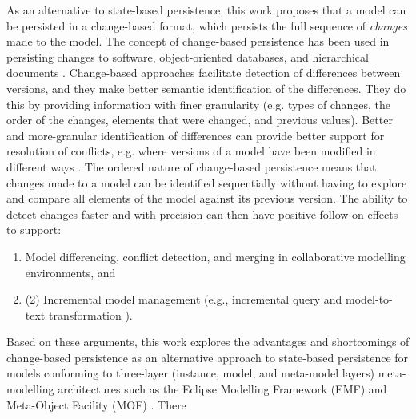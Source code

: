 As an alternative to state-based persistence, this work proposes that a model can be persisted in a change-based format, which persists the full sequence of \emph{changes} made to the model.
The concept of change-based persistence has been used in persisting changes to software, object-oriented databases, and hierarchical documents \cite{DBLP:journals/entcs/RobbesL07,DBLP:conf/sde/LippeO92,DBLP:conf/caise/IgnatN05}. Change-based approaches facilitate detection of differences between versions, and they make better semantic identification of the differences. They do this by providing information with finer granularity (e.g. types of changes, the order of the changes, elements that were changed, and previous values). Better and more-granular identification of differences can provide better support for resolution of conflicts, e.g. where versions of a model have been modified in different ways \cite{mens2002state}.
The ordered nature of change-based persistence means that changes made to a model can be identified sequentially without having to explore and compare all elements of the model against its previous version. The ability to detect changes faster and with precision can then have positive follow-on effects to support:
\begin{enumerate}
  \item Model differencing, conflict detection, and merging in collaborative modelling environments, and 
  \item (2) Incremental model management (e.g., incremental query \cite{DBLP:conf/ecmdafa/RathHV12} and model-to-text 
 transformation \cite{DBLP:conf/ecmdafa/OgunyomiRK15}).  
\end{enumerate}
Based on these arguments, this work explores the advantages and shortcomings of change-based persistence as an alternative approach to state-based persistence for models conforming to three-layer (instance, model, and meta-model layers) meta-modelling architectures such as the Eclipse Modelling Framework (EMF) \cite{eclipse2019emf} and Meta-Object Facility (MOF) \cite{omg2018mof}. There 

